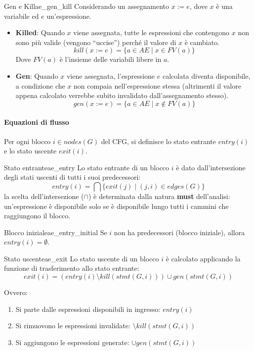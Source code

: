 \begin{definizione}{Gen e Kill}{ae_gen_kill}
Considerando un assegnamento $x := e$, dove $x$ è una variabile ed $e$
un'espressione.
\begin{itemize}
    \item \textbf{Killed}: Quando $x$ viene assegnata, tutte le espressioni
    che contengono $x$ non sono più valide (vengono ``uccise'') perché il
    valore di $x$ è cambiato.
    \[ kill(x := e) = \{ a \in AE \mid x \in FV(a) \} \]
    Dove $FV(a)$ è l'insieme delle variabili libere in $a$.
    
    \item \textbf{Gen}: Quando $x$ viene assegnata, l'espressione
    $e$ calcolata diventa disponibile, a condizione che $x$ non compaia
    nell'espressione stessa (altrimenti il valore appena calcolato verrebbe
    subito invalidato dall'assegnamento stesso).
    \[ gen(x := e) = \{ a \in AE \mid x \notin FV(a) \} \]
\end{itemize}
\end{definizione}

\paragraph{Equazioni di flusso}

Per ogni blocco $i \in nodes(G)$ del CFG, si definisce lo stato entrante
$entry(i)$ e lo stato uscente $exit(i)$.

\begin{definizione}{Stato entrante}{ae_entry}
Lo stato entrante di un blocco $i$ è dato dall'intersezione degli stati
uscenti di tutti i suoi predecessori:
\[
entry(i) = \bigcap \{exit(j) \mid (j, i) \in edges(G)\}
\]
la scelta dell'intersezione ($\cap$) è determinata dalla natura \textbf{must}
dell'analisi: un'espressione è disponibile solo se è disponibile lungo tutti
i cammini che raggiungono il blocco.

\end{definizione}

\begin {nota}{Blocco iniziale}{ae_entry_initial}
Se $i$ non ha predecessori (blocco iniziale), allora $entry(i) = \emptyset$.
\end{nota}

\begin{definizione}{Stato uscente}{ae_exit}
Lo stato uscente di un blocco $i$ è calcolato applicando la funzione di
trasferimento allo stato entrante:
\[
exit(i) = (entry(i) \setminus kill(stmt(G, i))) \cup gen(stmt(G, i))
\]

Ovvero:
\begin{enumerate}
    \item Si parte dalle espressioni disponibili in ingresso: $entry(i)$
    \item Si rimuovono le espressioni invalidate: $\setminus kill(stmt(G, i))$
    \item Si aggiungono le espressioni generate: $\cup gen(stmt(G, i))$
\end{enumerate}
\end{definizione}


